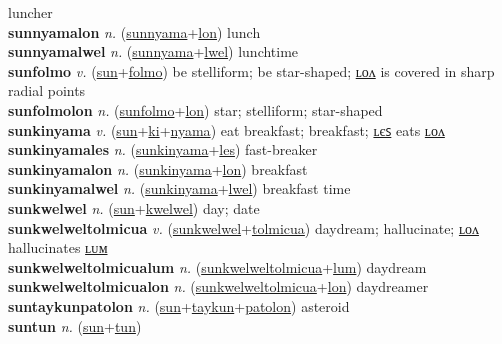 luncher \label{sunnyamales} \\
\textbf{sunnyamalon} \textit{n.} (\hyperref[sunnyama]{sunnyama}+\hyperref[lon]{lon})
lunch \label{sunnyamalon} \\
\textbf{sunnyamalwel} \textit{n.} (\hyperref[sunnyama]{sunnyama}+\hyperref[lwel]{lwel})
lunchtime \label{sunnyamalwel} \\
\textbf{sunfolmo} \textit{v.} (\hyperref[sun]{sun}+\hyperref[folmo]{folmo})
be stelliform; be star-shaped; \hyperref[sunfolmolon]{ʟᴏᴧ} is covered in sharp radial points \label{sunfolmo} \\
\textbf{sunfolmolon} \textit{n.} (\hyperref[sunfolmo]{sunfolmo}+\hyperref[lon]{lon})
star; stelliform; star-shaped \label{sunfolmolon} \\
\textbf{sunkinyama} \textit{v.} (\hyperref[sun]{sun}+\hyperref[ki]{ki}+\hyperref[nyama]{nyama})
eat breakfast; breakfast; \hyperref[sunkinyamales]{ʟєꜱ} eats \hyperref[sunkinyamalon]{ʟᴏᴧ} \label{sunkinyama} \\
\textbf{sunkinyamales} \textit{n.} (\hyperref[sunkinyama]{sunkinyama}+\hyperref[les]{les})
fast-breaker \label{sunkinyamales} \\
\textbf{sunkinyamalon} \textit{n.} (\hyperref[sunkinyama]{sunkinyama}+\hyperref[lon]{lon})
breakfast \label{sunkinyamalon} \\
\textbf{sunkinyamalwel} \textit{n.} (\hyperref[sunkinyama]{sunkinyama}+\hyperref[lwel]{lwel})
breakfast time \label{sunkinyamalwel} \\
\textbf{sunkwelwel} \textit{n.} (\hyperref[sun]{sun}+\hyperref[kwelwel]{kwelwel})
day; date \label{sunkwelwel} \\
\textbf{sunkwelweltolmicua} \textit{v.} (\hyperref[sunkwelwel]{sunkwelwel}+\hyperref[tolmicua]{tolmicua})
daydream; hallucinate; \hyperref[sunkwelweltolmicualon]{ʟᴏᴧ} hallucinates \hyperref[sunkwelweltolmicualum]{ʟᴜᴍ} \label{sunkwelweltolmicua} \\
\textbf{sunkwelweltolmicualum} \textit{n.} (\hyperref[sunkwelweltolmicua]{sunkwelweltolmicua}+\hyperref[lum]{lum})
daydream \label{sunkwelweltolmicualum} \\
\textbf{sunkwelweltolmicualon} \textit{n.} (\hyperref[sunkwelweltolmicua]{sunkwelweltolmicua}+\hyperref[lon]{lon})
daydreamer \label{sunkwelweltolmicualon} \\
\textbf{suntaykunpatolon} \textit{n.} (\hyperref[sun]{sun}+\hyperref[taykun]{taykun}+\hyperref[patolon]{patolon})
asteroid \label{suntaykunpatolon} \\
\textbf{suntun} \textit{n.} (\hyperref[sun]{sun}+\hyperref[tun]{tun})
